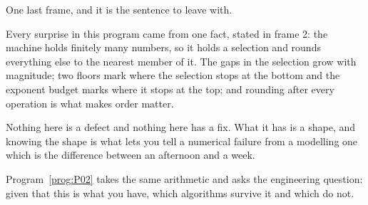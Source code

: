 \begin{fr}
One last frame, and it is the sentence to leave with.

Every surprise in this program came from one fact, stated in frame 2: the
machine holds finitely many numbers, so it holds a selection and rounds
everything else to the nearest member of it. The gaps in the selection grow
with magnitude; two floors mark where the selection stops at the bottom and
the exponent budget marks where it stops at the top; and rounding after every
operation is what makes order matter.

Nothing here is a defect and nothing here has a fix. What it has is a shape,
and knowing the shape is what lets you tell a numerical failure from a
modelling one \dash{} which is the difference between an afternoon and a week.

Program~\ref{prog:P02} takes the same arithmetic and asks the engineering
question: given that this is what you have, which algorithms survive it and
which do not.
\end{fr}

